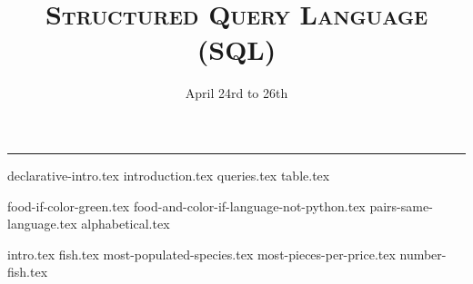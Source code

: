 \documentclass{exam}
\title{\textsc{Structured Query Language (SQL)}}
\date{April 24rd to 26th}
\begin{document}
\maketitle
\rule{\textwidth}{0.15em}
\fontsize{12}{15}\selectfont


{declarative-intro.tex}
{introduction.tex}
{queries.tex}
\newpage
{table.tex}
\begin{questions}
{food-if-color-green.tex}
{food-and-color-if-language-not-python.tex}
{pairs-same-language.tex}
{alphabetical.tex}

\newpage
{intro.tex}
{fish.tex}
{most-populated-species.tex}
{most-pieces-per-price.tex}
{number-fish.tex}

\end{questions}
\end{document}
